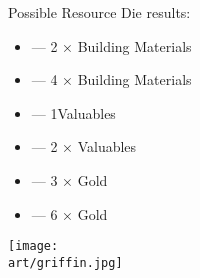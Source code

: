 \begin{multicols}{2}
Possible Resource Die  results:
\medskip
\begin{itemize}
  \setlength\itemsep{8pt}
  \item[{}] — 2 × Building Materials
  \item[{}] — 4 × Building Materials
  \item[{}] — 1\texttimes Valuables
  \item[{}] — 2 × Valuables
  \item[{}] — 3 × Gold
  \item[{}] — 6 × Gold
\end{itemize}


\end{multicols}

\vspace*{\fill}

\begin{scaledfigure}[blanker]
  \centering
  \texttt{[image: \\art/griffin.jpg]}
\end{scaledfigure}

